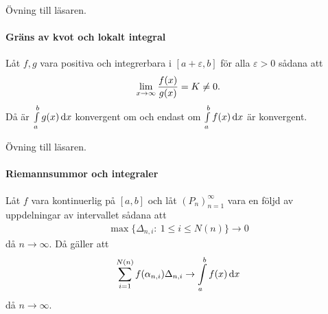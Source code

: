 \proof
Övning till läsaren.

\paragraph{Gräns av kvot och lokalt integral}
Låt $f, g$ vara positiva och integrerbara i $[a + \varepsilon, b]$ för alla $\varepsilon > 0$ sådana att
\begin{align*}
	\lim\limits_{x\to \infty}\frac{f(x)}{g(x)} = K\neq 0.
\end{align*}
Då är $\int\limits_{a}^{b}g(x)\dd{x}$ konvergent om och endast om $\int\limits_{a}^{b}f(x)\dd{x}$ är konvergent.

\proof
Övning till läsaren.

\paragraph{Riemannsummor och integraler}
Låt $f$ vara kontinuerlig på $[a, b]$ och låt $(P_n)_{n = 1}^{\infty}$ vara en följd av uppdelningar av intervallet sådana att
\begin{align*}
	\max{\{\Delta_{n, i}:\ 1\leq i\leq N(n)\}}\to 0
\end{align*}
då $n\to\infty$. Då gäller att
\begin{align*}
	\sum\limits_{i = 1}^{N(n)}f(\alpha_{n, i})\Delta_{n, i}\to \int\limits_{a}^{b}f(x)\dd{x}
\end{align*}
då $n\to\infty$.

\proof
